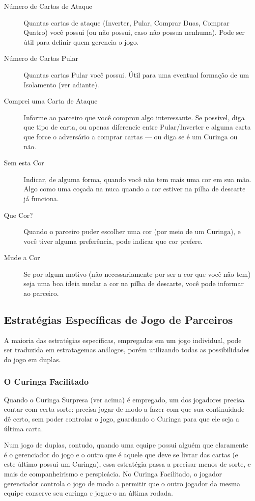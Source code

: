 \begin{description}
\item[Número de Cartas de Ataque]{Quantas cartas de ataque (Inverter, Pular, Comprar Duas, Comprar Quatro) você possui (ou não possui, caso não possua nenhuma). Pode ser útil para definir quem gerencia o jogo.}
\item[Número de Cartas Pular]{Quantas cartas Pular você possui. Útil para uma eventual formação de um Isolamento (ver adiante).}
\item[Comprei uma Carta de Ataque]{Informe ao parceiro que você comprou algo interessante. Se possível, diga que tipo de carta, ou apenas diferencie entre Pular/Inverter e alguma carta que force o adversário a comprar cartas --- ou diga se é um Curinga ou não.}
\item[Sem esta Cor]{Indicar, de alguma forma, quando você não tem mais uma cor em sua mão. Algo como uma coçada na nuca quando a cor estiver na pilha de descarte já funciona.}
\item[Que Cor?]{Quando o parceiro puder escolher uma cor (por meio de um Curinga), e você tiver alguma preferência, pode indicar que cor prefere.}
\item[Mude a Cor]{Se por algum motivo (não necessariamente por ser a cor que você não tem) seja uma boa ideia mudar a cor na pilha de descarte, você pode informar ao parceiro.}
\end{description}

\subsection{Estratégias Específicas de Jogo de Parceiros}

A maioria das estratégias específicas, empregadas em um jogo individual, pode ser traduzida em estratagemas análogos, porém utilizando todas as possibilidades do jogo em duplas.

\subsubsection{O Curinga Facilitado}

Quando o Curinga Surpresa (ver acima) é empregado, um dos jogadores precisa contar com certa sorte: precisa jogar de modo a fazer com que sua continuidade dê certo, sem poder controlar o jogo, guardando o Curinga para que ele seja a última carta.

Num jogo de duplas, contudo, quando uma equipe possui alguém que claramente é o gerenciador do jogo e o outro que é aquele que deve se livrar das cartas (e este último possui um Curinga), essa estratégia passa a precisar menos de sorte, e mais de companheirismo e perspicácia. No Curinga Facilitado, o jogador gerenciador controla o jogo de modo a permitir que o outro jogador da mesma equipe conserve seu curinga e jogue-o na última rodada. 

